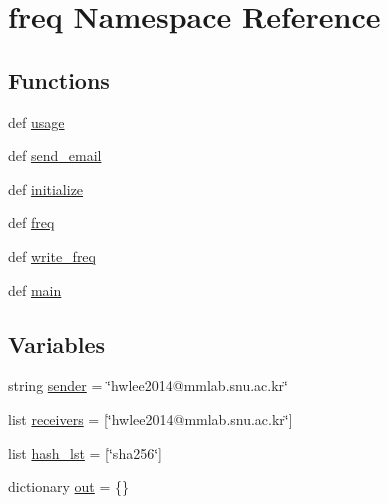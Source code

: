 \hypertarget{namespacefreq}{\section{freq Namespace Reference}
\label{namespacefreq}
}
\subsection*{Functions}
\begin{DoxyCompactItemize}
\item 
def \hyperlink{namespacefreq_a7fe4131f9ae3da9c73a19e1e655e12bb}{usage}
\item 
def \hyperlink{namespacefreq_a6a1dcad66f5f83ce09aded3750fd8f65}{send\-\_\-email}
\item 
def \hyperlink{namespacefreq_ae2d967254a034f900f990a33079ec0a5}{initialize}
\item 
def \hyperlink{namespacefreq_aaa56d2a18f9097aecd7664c085890acf}{freq}
\item 
def \hyperlink{namespacefreq_a012117cea3fca098bb5bcd4c28fe3eaa}{write\-\_\-freq}
\item 
def \hyperlink{namespacefreq_a0be37ddc5fd6c83969764ad192a5c306}{main}
\end{DoxyCompactItemize}
\subsection*{Variables}
\begin{DoxyCompactItemize}
\item 
string \hyperlink{namespacefreq_ab86364d24c362e07c325288107da8bef}{sender} = \char`\"{}hwlee2014@mmlab.\-snu.\-ac.\-kr\char`\"{}
\item 
list \hyperlink{namespacefreq_a62efa438f460b688a9b7a448589b39db}{receivers} = \mbox{[}\char`\"{}hwlee2014@mmlab.\-snu.\-ac.\-kr\char`\"{}\mbox{]}
\item 
list \hyperlink{namespacefreq_a0c55ef62970b29c3431112c3f526866c}{hash\-\_\-lst} = \mbox{[}\char`\"{}sha256\char`\"{}\mbox{]}
\item 
dictionary \hyperlink{namespacefreq_a669a9e1968c9f172d4ef2fdb07389344}{out} = \{\}
\end{DoxyCompactItemize}


